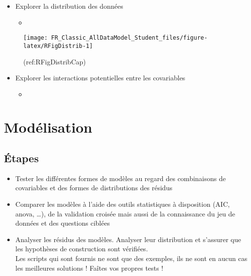 \documentclass[french,a4paper]{article}
\providecommand{\tightlist}{%
  \setlength{\itemsep}{0pt}\setlength{\parskip}{0pt}}
\begin{document}
\begin{itemize}
\tightlist
\item
  Explorer la distribution des données

  \begin{itemize}
  \item
  \end{itemize}
\end{itemize}

\begin{figure}[!h]

{\centering \texttt{[image: FR\_Classic\_AllDataModel\_Student\_files/figure-latex/RFigDistrib-1]} 

}

\caption{(ref:RFigDistribCap)}\label{fig:RFigDistrib}
\end{figure}

\begin{itemize}
\tightlist
\item
  Explorer les interactions potentielles entre les covariables

  \begin{itemize}
  \item
  \end{itemize}
\end{itemize}

\hypertarget{modelisation}{%
\section{Modélisation}\label{modelisation}}

\hypertarget{etapes-1}{%
\subsection{Étapes}\label{etapes-1}}


\begin{itemize}
\tightlist
\item
  Tester les différentes formes de modèles au regard des combinaisons de covariables et des formes de distributions des résidus
\item
  Comparer les modèles à l'aide des outils statistiques à disposition (AIC, anova, \ldots), de la validation croisée mais aussi de la connaissance du jeu de données et des questions ciblées
\item
  Analyser les résidus des modèles. Analyser leur distribution et s'assurer que les hypothèses de construction sont vérifiées.\\
  \nopandoc{\begin{redbox}}
  Les scripts qui sont fournis ne sont que des exemples, ils ne sont en aucun cas les meilleures solutions !
  Faîtes vos propres tests !
  \nopandoc{\end{redbox}}
\end{itemize}
\end{document}
